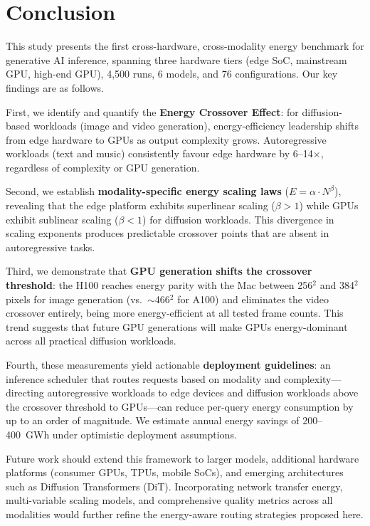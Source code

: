 \documentclass[preprint,12pt]{elsarticle}
\begin{document}
\section{Conclusion}
\label{sec:conclusion}

This study presents the first cross-hardware, cross-modality energy benchmark for generative AI inference, spanning three hardware tiers (edge SoC, mainstream GPU, high-end GPU), 4,500 runs, 6 models, and 76 configurations. Our key findings are as follows.

First, we identify and quantify the \textbf{Energy Crossover Effect}: for diffusion-based workloads (image and video generation), energy-efficiency leadership shifts from edge hardware to GPUs as output complexity grows. Autoregressive workloads (text and music) consistently favour edge hardware by 6--14$\times$, regardless of complexity or GPU generation.

Second, we establish \textbf{modality-specific energy scaling laws} ($E = \alpha \cdot N^\beta$), revealing that the edge platform exhibits superlinear scaling ($\beta > 1$) while GPUs exhibit sublinear scaling ($\beta < 1$) for diffusion workloads. This divergence in scaling exponents produces predictable crossover points that are absent in autoregressive tasks.

Third, we demonstrate that \textbf{GPU generation shifts the crossover threshold}: the H100 reaches energy parity with the Mac between 256$^2$ and 384$^2$ pixels for image generation (vs.\ $\sim$466$^2$ for A100) and eliminates the video crossover entirely, being more energy-efficient at all tested frame counts. This trend suggests that future GPU generations will make GPUs energy-dominant across all practical diffusion workloads.

Fourth, these measurements yield actionable \textbf{deployment guidelines}: an inference scheduler that routes requests based on modality and complexity---directing autoregressive workloads to edge devices and diffusion workloads above the crossover threshold to GPUs---can reduce per-query energy consumption by up to an order of magnitude. We estimate annual energy savings of 200--400~GWh under optimistic deployment assumptions.

Future work should extend this framework to larger models, additional hardware platforms (consumer GPUs, TPUs, mobile SoCs), and emerging architectures such as Diffusion Transformers (DiT). Incorporating network transfer energy, multi-variable scaling models, and comprehensive quality metrics across all modalities would further refine the energy-aware routing strategies proposed here.
\end{document}
